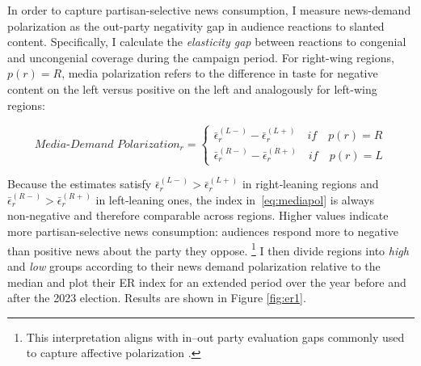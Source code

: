 \documentclass[12pt]{article}
\begin{document}
	
In order to capture partisan-selective news consumption, I measure  news-demand polarization as the out-party negativity gap in audience reactions to slanted content. Specifically, I calculate the \emph{elasticity gap} between reactions to congenial and uncongenial coverage during the campaign period. For right-wing regions, $p(r)=R$, media polarization refers to the difference in taste for negative content on the left versus positive on the left and analogously for left-wing regions:
	
	
	\begin{equation}
		\textit{Media-Demand Polarization}_r  =	\begin{cases}
			\bar{\epsilon}_r^{(L-)}- \bar{\epsilon}_r^{(L+)} \quad if \quad p(r)=R\\
			\bar{\epsilon}_r^{(R-)}- \bar{\epsilon}_r^{(R+)} \quad if \quad p(r)=L
		\end{cases}
		\label{eq:mediapol}
	\end{equation}
	
	
	
	Because the estimates satisfy
	\(\bar{\epsilon}_r^{(L-)}>\bar{\epsilon}_r^{(L+)}\) in right‑leaning regions and
	\(\bar{\epsilon}_r^{(R-)}>\bar{\epsilon}_r^{(R+)}\) in left‑leaning ones,
	the index in~\eqref{eq:mediapol} is always non‑negative and therefore comparable across regions. Higher values indicate more partisan-selective news consumption: audiences 	 respond more to negative than positive news about the party they oppose. \footnote{This interpretation aligns with in–out party evaluation gaps commonly used to capture affective polarization \citep{IyengarLelkesLevendusky2019Origins}.} I then divide regions into \textit{high} and \textit{low} groups according to their news demand polarization  relative to the median and plot their ER index for an extended period over the year before and after the 2023 election.  Results are shown in Figure \ref{fig:er1}.
	
	
	
\end{document}
